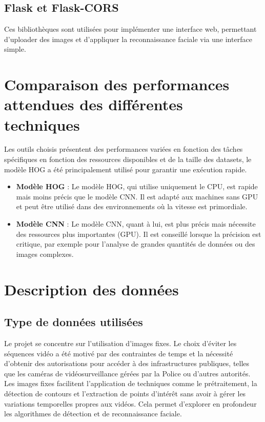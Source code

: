 \documentclass[a4paper,12pt]{report}
\begin{document}
\subsection{Flask et Flask-CORS}
Ces bibliothèques sont utilisées pour implémenter une interface web, permettant d'uploader des images et d'appliquer la reconnaissance faciale via une interface simple.

\section{Comparaison des performances attendues des différentes techniques}
Les outils choisis présentent des performances variées en fonction des tâches spécifiques en fonction des ressources disponibles et de la taille des datasets, le modèle HOG a été principalement utilisé pour garantir une exécution rapide.

\begin{itemize}
    \item \textbf{Modèle HOG} : Le modèle HOG, qui utilise uniquement le CPU, est rapide mais moins précis que le modèle CNN. Il est adapté aux machines sans GPU et peut être utilisé dans des environnements où la vitesse est primordiale.
    \item \textbf{Modèle CNN} : Le modèle CNN, quant à lui, est plus précis mais nécessite des ressources plus importantes (GPU). Il est conseillé lorsque la précision est critique, par exemple pour l'analyse de grandes quantités de données ou des images complexes.
\end{itemize}

\section{Description des données}
\subsection{Type de données utilisées}
Le projet se concentre sur l'utilisation d'images fixes. Le choix d'éviter les séquences vidéo a été motivé par des contraintes de temps et la nécessité d'obtenir des autorisations pour accéder à des infrastructures publiques, telles que les caméras de vidéosurveillance gérées par la Police ou d'autres autorités.
Les images fixes facilitent l'application de techniques comme le prétraitement, la détection de contours et l'extraction de points d'intérêt sans avoir à gérer les variations temporelles propres aux vidéos. Cela permet d'explorer en profondeur les algorithmes de détection et de reconnaissance faciale.
\end{document}
